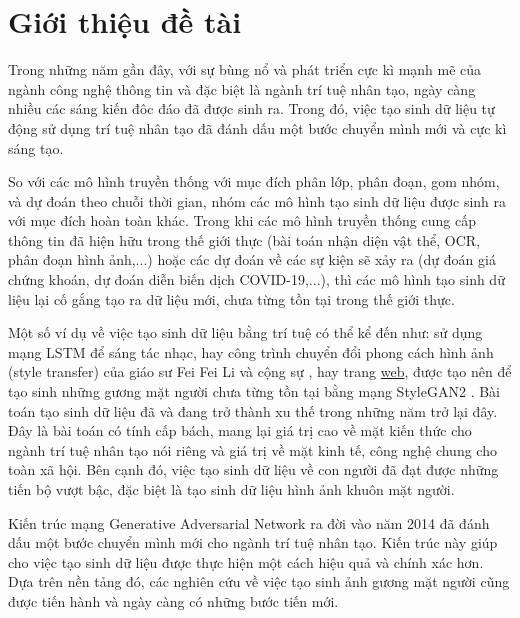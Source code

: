 \chapter{Giới thiệu đề tài}

Trong những năm gần đây, với sự bùng nổ và phát triển cực kì mạnh mẽ của ngành công nghệ thông tin và đặc biệt là ngành trí tuệ nhân tạo, ngày càng nhiều các sáng kiến đôc đáo đã được sinh ra. Trong đó, việc tạo sinh dữ liệu tự động sử dụng trí tuệ nhân tạo đã đánh dấu một bước chuyển mình mới và cực kì sáng tạo.

So với các mô hình truyền thống với mục đích phân lớp, phân đoạn, gom nhóm, và dự đoán theo chuỗi thời gian, nhóm các mô hình tạo sinh dữ liệu được sinh ra với mục đích hoàn toàn khác. Trong khi các mô hình truyền thống cung cấp thông tin đã hiện hữu trong thế giới thực (bài toán nhận diện vật thể, OCR, phân đoạn hình ảnh,...) hoặc các dự đoán về các sự kiện sẽ xảy ra (dự đoán giá chứng khoán, dự đoán diễn biến dịch COVID-19,...), thì các mô hình tạo sinh dữ liệu lại cố gắng tạo ra dữ liệu mới, chưa từng tồn tại trong thế giới thực.

Một số ví dụ về việc tạo sinh dữ liệu bằng trí tuệ có thể kể đến như: sử dụng mạng LSTM \cite{lstm} để sáng tác nhạc, hay công trình chuyển đổi phong cách hình ảnh (style transfer) của giáo sư Fei Fei Li và cộng sự \cite{Johnson2016Perceptual}, hay trang \href{https://thispersondoesnotexist.com}{web}, được tạo nên để tạo sinh những gương mặt người chưa từng tồn tại bằng mạng StyleGAN2 \cite{stylegans}. Bài toán tạo sinh dữ liệu \cite{synthetic_data} đã và đang trở thành xu thế trong những năm trở lại đây. Đây là bài toán có tính cấp bách, mang lại giá trị cao về mặt kiến thức cho ngành trí tuệ nhân tạo nói riêng và giá trị về mặt kinh tế, công nghệ chung cho toàn xã hội. Bên cạnh đó, việc tạo sinh dữ liệu về con người đã đạt được những tiến bộ vượt bậc, đặc biệt là tạo sinh dữ liệu hình ảnh khuôn mặt người.

Kiến trúc mạng Generative Adversarial Network \cite{gans_base} ra đời vào năm 2014 đã đánh dấu một bước chuyển mình mới cho ngành trí tuệ nhân tạo. Kiến trúc này giúp cho việc tạo sinh dữ liệu được thực hiện một cách hiệu quả và chính xác hơn. Dựa trên nền tảng đó, các nghiên cứu về việc tạo sinh ảnh gương mặt người cũng được tiến hành và ngày càng có những bước tiến mới.

